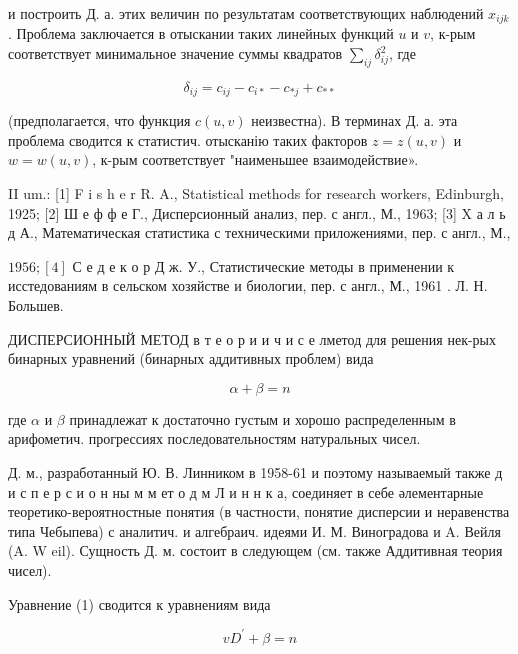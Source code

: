 \documentclass[10pt]{article}
\begin{document}
и построить Д. а. этих величин по результатам соответствующих наблюдений $x_{i j k}$. Проблема заключается в отыскании таких линейных функций $u$ и $v$, к-рым соответствует минимальное значение суммы квадратов $\sum_{i j} \delta_{i j}^{2}$, где



\[

\delta_{i j}=c_{i j}-c_{i *}-c_{* j}+c_{* *}

\]



(предполагается, что функция $c(u, v)$ неизвестна). В терминах Д. а. эта проблема сводится к статистич. отысканію таких факторов $z=z(u, v)$ и $w=w(u, v)$, к-рым соответствует "наименьшее взаимодействие».



II um.: [1] F i s h e r R. A., Statistical methods for research workers, Edinburgh, 1925; [2] Ш е ф ф е Г., Дисперсионный анализ, пер. с англ., М., 1963; [3] X а л ь д А., Математическая статистика с техническими приложениями, пер. с англ., М.,

$1956 ;[4]$ С е д е к о р Д ж. У., Статистические методы в применении к исстедованиям в сельском хозяйстве и биологии, пер. с англ., М., 1961 . Л. Н. Большев.



ДИСПЕРСИОННЫЙ МЕТОД в т е о р и и ч и с е лметод для решения нек-рых бинарных уравнений (бинарных аддитивных проблем) вида



\[

\alpha+\beta=n

\]



где $\alpha$ и $\beta$ принадлежат к достаточно густым и хорошо распределенным в арифометич. прогрессиях последовательностям натуральных чисел.



Д. м., разработанный Ю. В. Линником в 1958-61 и поэтому называемый также д и с п е р с и о н ны м м ет о д м Л и н н к а, соединяет в себе әлементарные теоретико-вероятностные понятия (в частности, понятие дисперсии и неравенства типа Чебыпева) с аналитич. и алгебраич. идеями И. М. Виноградова и A. Вейля (A. W eil). Сущность Д. м. состоит в следующем (см. также Аддитивная теория чисел).



Уравнение (1) сводится к уравнениям вида



\[

v D^{\prime}+\beta=n

\]
\end{document}
